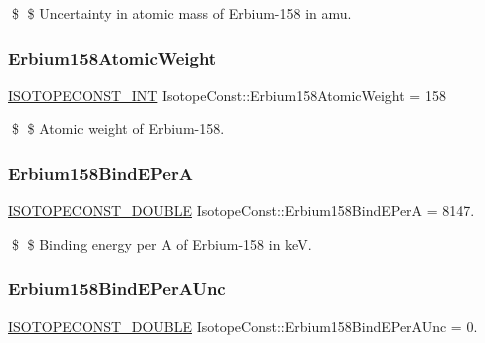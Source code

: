 \$ \$ Uncertainty in atomic mass of Erbium-\/158 in amu. \mbox{\label{group___isotope_const-_erbium-_er158_ga4a87da16bca9e0663a1360874d519e1c}} 
\subsubsection{\texorpdfstring{Erbium158\+Atomic\+Weight}{Erbium158AtomicWeight}}
{\footnotesize\ttfamily \mbox{\hyperlink{group___isotope_const-_macros_ga5f18360b3e99483a35c32d789e62621c}{I\+S\+O\+T\+O\+P\+E\+C\+O\+N\+S\+T\+\_\+\+I\+NT}} Isotope\+Const\+::\+Erbium158\+Atomic\+Weight = 158}

\$ \$ Atomic weight of Erbium-\/158. \mbox{\label{group___isotope_const-_erbium-_er158_gab394959b7849cdc15e463e5cadc130a3}} 
\subsubsection{\texorpdfstring{Erbium158\+Bind\+E\+PerA}{Erbium158BindEPerA}}
{\footnotesize\ttfamily \mbox{\hyperlink{group___isotope_const-_macros_ga8f45a7272ce02c0b4c65c44636ed719a}{I\+S\+O\+T\+O\+P\+E\+C\+O\+N\+S\+T\+\_\+\+D\+O\+U\+B\+LE}} Isotope\+Const\+::\+Erbium158\+Bind\+E\+PerA = 8147.}

\$ \$ Binding energy per A of Erbium-\/158 in keV. \mbox{\label{group___isotope_const-_erbium-_er158_gaa40c876cca58477f7f6d19250c928062}} 
\subsubsection{\texorpdfstring{Erbium158\+Bind\+E\+Per\+A\+Unc}{Erbium158BindEPerAUnc}}
{\footnotesize\ttfamily \mbox{\hyperlink{group___isotope_const-_macros_ga8f45a7272ce02c0b4c65c44636ed719a}{I\+S\+O\+T\+O\+P\+E\+C\+O\+N\+S\+T\+\_\+\+D\+O\+U\+B\+LE}} Isotope\+Const\+::\+Erbium158\+Bind\+E\+Per\+A\+Unc = 0.}

